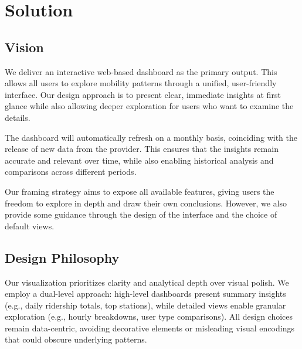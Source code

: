\section{Solution}
\subsection{Vision}
We deliver an interactive web-based dashboard as the primary output. 
This allows all users to explore mobility patterns through a unified, user-friendly interface. 
Our design approach is to present clear, immediate insights at first glance while also allowing deeper exploration for users who want to examine the details.

The dashboard will automatically refresh on a monthly basis, coinciding with the release of new data from the provider. 
This ensures that the insights remain accurate and relevant over time, while also enabling historical analysis and comparisons across different periods.

Our framing strategy aims to expose all available features, giving users the freedom to explore in depth and draw their own conclusions. 
However, we also provide some guidance through the design of the interface and the choice of default views.

\subsection{Design Philosophy}
Our visualization prioritizes clarity and analytical depth over visual polish.
We employ a dual-level approach: high-level dashboards present summary insights (e.g., daily ridership totals, top stations), while detailed views enable granular exploration (e.g., hourly breakdowns, user type comparisons).
All design choices remain data-centric, avoiding decorative elements or misleading visual encodings that could obscure underlying patterns.

